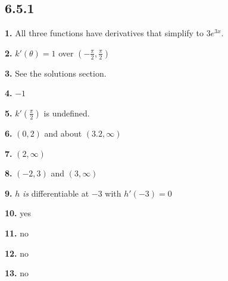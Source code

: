 \documentclass[12pt,]{book}
\theoremstyle{plain}
\theoremstyle{definition}
\numberwithin{equation}{section}
\newcommand{\fe}[2]{#1\mathopen{}\left(#2\right)\mathclose{}}
\newcommand{\ointerval}[2]{\left(#1,#2\right)}
\newcommand{\fd}[1]{#1'}
\begin{document}
\subsection*{6.5.1 }
\noindent\textbf{1.}\quad{}
                All three functions have derivatives that simplify to \(3e^{3x}\).%

            \par\smallskip
\noindent\textbf{2.}\quad{}
                    \(\fe{\fd{k}}{\theta}=1\) over \(\ointerval{-\frac{\pi}{2}}{\frac{\pi}{2}}\)%

                \par\smallskip
\noindent\textbf{3.}\quad{}
                    See the solutions section.%

                \par\smallskip
\noindent\textbf{4.}\quad{}
                    \(-1\)%

                \par\smallskip
\noindent\textbf{5.}\quad{}
                    \(\fe{\fd{k}}{\frac{\pi}{2}}\) is undefined.%

                \par\smallskip
\noindent\textbf{6.}\quad{}
                    \(\ointerval{0}{2}\) and about \(\ointerval{3.2}{\infty}\)%

                \par\smallskip
\noindent\textbf{7.}\quad{}
                    \(\ointerval{2}{\infty}\)%

                \par\smallskip
\noindent\textbf{8.}\quad{}
                    \(\ointerval{-2}{3}\) and \(\ointerval{3}{\infty}\)%

                \par\smallskip
\noindent\textbf{9.}\quad{}
                    \(h\) \emph{is} differentiable at \(-3\) with \(\fe{\fd{h}}{-3}=0\)%

                \par\smallskip
\noindent\textbf{10.}\quad{}
                    yes%

                \par\smallskip
\noindent\textbf{11.}\quad{}
                    no%

                \par\smallskip
\noindent\textbf{12.}\quad{}
                    no%

                \par\smallskip
\noindent\textbf{13.}\quad{}
                    no%
\end{document}
